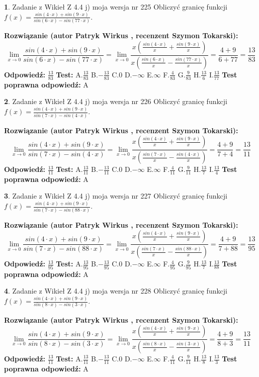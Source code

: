 \documentclass[12pt, a4paper]{article}
\theoremstyle{definition} %
\newtheorem{zad}{}
\newcommand{\zadStart}[1]{\begin{zad}#1\newline}
\newcommand{\zadStop}{\end{zad}}
\newcommand{\rozwStart}[2]{\noindent \textbf{Rozwiązanie (autor #1 , recenzent #2): }\newline}
\newcommand{\rozwStop}{\newline}
\newcommand{\odpStart}{\noindent \textbf{Odpowiedź:}\newline}
\newcommand{\odpStop}{\newline}
\newcommand{\testStart}{\noindent \textbf{Test:}\newline}
\newcommand{\testStop}{\newline}
\newcommand{\kluczStart}{\noindent \textbf{Test poprawna odpowiedź:}\newline}
\newcommand{\kluczStop}{\newline}
\begin{document}
\zadStart{Zadanie z Wikieł Z 4.4 j) moja wersja nr 225}
Obliczyć granicę funkcji $f(x)=\frac{sin(4\cdot x) +sin(9\cdot x)}{sin(6\cdot x) -sin(77\cdot x)}$.
\zadStop
\rozwStart{Patryk Wirkus}{Szymon Tokarski}
$$\lim\limits_{x\to 0}\frac{sin(4\cdot x) +sin(9\cdot x)}{sin(6\cdot x) -sin(77\cdot x)}=\lim\limits_{x\to 0}\frac{x(\frac{sin(4\cdot x)}{x}+\frac{sin(9\cdot x)}{x})}{x(\frac{sin(6\cdot x)}{x}-\frac{sin(77\cdot x)}{x})}=\frac{4+9}{6+77} = \frac{13}{83}$$
\rozwStop
\odpStart
$\frac{13}{83}$
\odpStop
\testStart
A.$\frac{13}{83}$
B.$-\frac{13}{83}$
C.$0$
D.$-\infty$
E.$\infty$
F.$\frac{4}{83}$
G.$\frac{9}{83}$
H.$\frac{13}{6}$
I.$\frac{13}{77}$
\testStop
\kluczStart
A
\kluczStop



\zadStart{Zadanie z Wikieł Z 4.4 j) moja wersja nr 226}
Obliczyć granicę funkcji $f(x)=\frac{sin(4\cdot x) +sin(9\cdot x)}{sin(7\cdot x) -sin(4\cdot x)}$.
\zadStop
\rozwStart{Patryk Wirkus}{Szymon Tokarski}
$$\lim\limits_{x\to 0}\frac{sin(4\cdot x) +sin(9\cdot x)}{sin(7\cdot x) -sin(4\cdot x)}=\lim\limits_{x\to 0}\frac{x(\frac{sin(4\cdot x)}{x}+\frac{sin(9\cdot x)}{x})}{x(\frac{sin(7\cdot x)}{x}-\frac{sin(4\cdot x)}{x})}=\frac{4+9}{7+4} = \frac{13}{11}$$
\rozwStop
\odpStart
$\frac{13}{11}$
\odpStop
\testStart
A.$\frac{13}{11}$
B.$-\frac{13}{11}$
C.$0$
D.$-\infty$
E.$\infty$
F.$\frac{4}{11}$
G.$\frac{9}{11}$
H.$\frac{13}{7}$
I.$\frac{13}{4}$
\testStop
\kluczStart
A
\kluczStop



\zadStart{Zadanie z Wikieł Z 4.4 j) moja wersja nr 227}
Obliczyć granicę funkcji $f(x)=\frac{sin(4\cdot x) +sin(9\cdot x)}{sin(7\cdot x) -sin(88\cdot x)}$.
\zadStop
\rozwStart{Patryk Wirkus}{Szymon Tokarski}
$$\lim\limits_{x\to 0}\frac{sin(4\cdot x) +sin(9\cdot x)}{sin(7\cdot x) -sin(88\cdot x)}=\lim\limits_{x\to 0}\frac{x(\frac{sin(4\cdot x)}{x}+\frac{sin(9\cdot x)}{x})}{x(\frac{sin(7\cdot x)}{x}-\frac{sin(88\cdot x)}{x})}=\frac{4+9}{7+88} = \frac{13}{95}$$
\rozwStop
\odpStart
$\frac{13}{95}$
\odpStop
\testStart
A.$\frac{13}{95}$
B.$-\frac{13}{95}$
C.$0$
D.$-\infty$
E.$\infty$
F.$\frac{4}{95}$
G.$\frac{9}{95}$
H.$\frac{13}{7}$
I.$\frac{13}{88}$
\testStop
\kluczStart
A
\kluczStop



\zadStart{Zadanie z Wikieł Z 4.4 j) moja wersja nr 228}
Obliczyć granicę funkcji $f(x)=\frac{sin(4\cdot x) +sin(9\cdot x)}{sin(8\cdot x) -sin(3\cdot x)}$.
\zadStop
\rozwStart{Patryk Wirkus}{Szymon Tokarski}
$$\lim\limits_{x\to 0}\frac{sin(4\cdot x) +sin(9\cdot x)}{sin(8\cdot x) -sin(3\cdot x)}=\lim\limits_{x\to 0}\frac{x(\frac{sin(4\cdot x)}{x}+\frac{sin(9\cdot x)}{x})}{x(\frac{sin(8\cdot x)}{x}-\frac{sin(3\cdot x)}{x})}=\frac{4+9}{8+3} = \frac{13}{11}$$
\rozwStop
\odpStart
$\frac{13}{11}$
\odpStop
\testStart
A.$\frac{13}{11}$
B.$-\frac{13}{11}$
C.$0$
D.$-\infty$
E.$\infty$
F.$\frac{4}{11}$
G.$\frac{9}{11}$
H.$\frac{13}{8}$
I.$\frac{13}{3}$
\testStop
\kluczStart
A
\kluczStop
\end{document}
